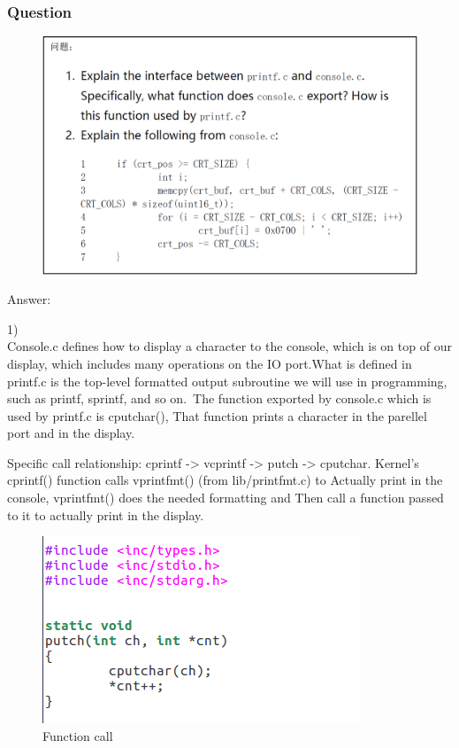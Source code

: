 \subsubsection{Question}
\begin{figure}[H]
  \centering
  \includegraphics[width=0.8\linewidth]{figure/question}
\end{figure}
{\Large Answer:}\\
\begin{flushleft}
1)\\
\qquad Console.c defines how to display a character to the console, which is on top of our display, which includes many operations on the IO port.What is defined in printf.c is the top-level formatted output subroutine we will use in programming, such as printf, sprintf, and so on. The function exported by console.c which is used by printf.c is cputchar(),
That function prints a character in the parellel port and in the display.

\qquad Specific call relationship: cprintf -> vcprintf -> putch -> cputchar. Kernel's cprintf() function calls vprintfmt() (from lib/printfmt.c) to
Actually print in the console, vprintfmt() does the needed formatting and
Then call a function passed to it to actually print in the display.
\end{flushleft}
\begin{figure}[H]
  \centering
  \includegraphics[width=0.8\linewidth]{figure/interface}
  \caption{Function call}\label{2}
\end{figure}
